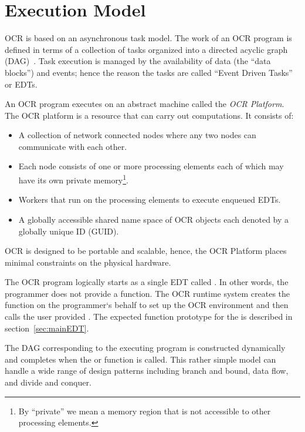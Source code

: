 %

\section{Execution Model}
\label{sec:ExecutionModel}

OCR is based on an asynchronous task model. The work of an OCR program
is defined in terms of a collection of tasks  organized
into a directed acyclic graph (DAG)~\cite{TaSa11,Tasirlar11,Zuckerman:2011:UCP:2000417.2000424}.
Task execution is managed by the availability of data (the ``data
blocks'') and events; hence the reason the tasks are called ``Event
Driven Tasks'' or EDTs.

An OCR program executes on an abstract machine called the \emph{OCR
Platform}. The OCR platform is a resource that can carry out
computations. It consists of:
\begin{itemize}
\item A collection of network connected nodes where any two nodes can
communicate with each other.
\item Each node consists of one or more processing elements each of
which may have its own private memory\footnote{By ``private'' we mean a
memory region that is not accessible to other processing
elements.}.
\item Workers that run on the processing elements to execute enqueued EDTs.
\item A globally accessible shared name space of OCR objects each
denoted by a globally unique ID (GUID).
\end{itemize}
OCR is designed to be portable and scalable, hence, the OCR Platform
places minimal constraints on the physical hardware.



The OCR program logically starts as a single EDT called .
In other words, the programmer does not provide a  function.
The OCR runtime system creates the  function on the programmer`s
behalf to set up the OCR environment and then calls the user provided
. The expected function prototype for the
 is described in section~\ref{sec:mainEDT}.

The DAG corresponding to the executing program is constructed
dynamically and completes when the
 or  function is called.
This rather simple model can handle a wide range of
design patterns including branch and bound, data flow, and divide and
conquer.
%

